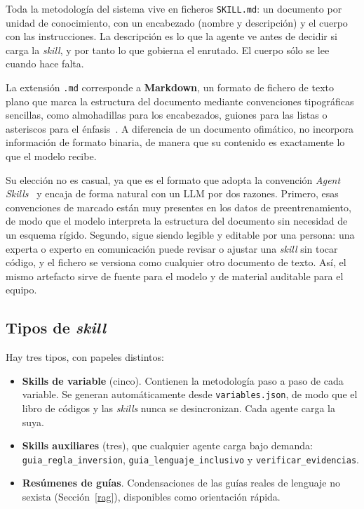 
Toda la metodología del sistema vive en ficheros \texttt{SKILL.md}: un documento
por unidad de conocimiento, con un encabezado (nombre y descripción) y el cuerpo
con las instrucciones. La descripción es lo que la agente ve antes de decidir si
carga la \textit{skill}, y por tanto lo que gobierna el enrutado. El cuerpo sólo se lee
cuando hace falta.

La extensión \texttt{.md} corresponde a \textbf{Markdown}, un formato de fichero de
texto plano que marca la estructura del documento mediante convenciones
tipográficas sencillas, como almohadillas para los encabezados, guiones para las
listas o asteriscos para el énfasis~\cite{gruber2004markdown}. A diferencia de un
documento ofimático, no incorpora información de formato binaria, de manera que su
contenido es exactamente lo que el modelo recibe.

Su elección no es casual, ya que es el formato que adopta la convención
\textit{Agent Skills}~\cite{anthropic2025skills} y encaja de forma natural con un
LLM por dos razones. Primero, esas convenciones de marcado están muy presentes en
los datos de preentrenamiento, de modo que el modelo interpreta la estructura del
documento sin necesidad de un esquema rígido. Segundo, sigue siendo legible y editable por una persona: una
experta o experto en comunicación puede revisar o ajustar una \textit{skill} sin tocar código, y el
fichero se versiona como cualquier otro documento de texto. Así, el mismo artefacto
sirve de fuente para el modelo y de material auditable para el equipo.

\subsection{Tipos de \textit{skill}}

Hay tres tipos, con papeles distintos:

\begin{itemize}
    \item \textbf{Skills de variable} (cinco). Contienen la metodología paso a
    paso de cada variable. Se generan automáticamente desde
    \texttt{variables.json}, de modo que el libro de códigos y las \textit{skills} nunca se
    desincronizan. Cada agente carga la suya.
    \item \textbf{Skills auxiliares} (tres), que cualquier agente carga bajo
    demanda: \texttt{guia\_regla\_inversion},
    \texttt{guia\_lenguaje\_inclusivo} y \texttt{verificar\_evidencias}.
    \item \textbf{Resúmenes de guías}. Condensaciones de las guías reales de
    lenguaje no sexista (Sección~\ref{rag}), disponibles como orientación rápida.
\end{itemize}

